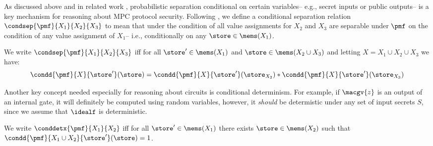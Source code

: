 As discussed above and in related work \cite{XXX}, probabilistic
separation conditional on certain variables-- e.g., secret inputs or
public outputs-- is a key mechanism for reasoning about MPC protocol
security. Following \cite{XXX}, we define a conditional separation
relation $\condsep{\pmf}{X_1}{X_2}{X_3}$ to mean that
under the condition of all value assignments for
$X_2$ and $X_3$ are separable under $\pmf$ on the condition
of any value assignment of $X_1$-- i.e., conditionally
on any $\store \in \mems(X_1)$. 
\begin{definition}
  We write $\condsep{\pmf}{X_1}{X_2}{X_3}$ iff for all
  $\store' \in \mems(X_1)$ and $\store \in \mems(X_2 \cup X_3)$
  and letting $X = X_1 \cup X_2 \cup X_3$ we have:
  $$\condd{\pmf}{X}{\store'}(\store) =
  \condd{\pmf}{X}{\store'}(\store_{X_2}) *
  \condd{\pmf}{X}{\store'}(\store_{X_3})$$
\end{definition}
Another key concept needed especially for reasoning about
circuits is conditional determinism. For example, if
$\macgv{z}$ is an output of an internal gate, it will
definitely be computed using random variables, however,
it \emph{should} be determistic under any set of input
secrets $S$, since we assume that $\idealf$ is
deterministic.
\begin{definition}  
  We write $\conddetx{\pmf}{X_1}{X_2}$ iff for all
  $\store' \in \mems(X_1)$ there exists 
  $\store \in \mems(X_2)$ such that
  $\condd{\pmf}{X_1 \cup X_2}{\store'}(\store) = 1$.
\end{definition}

